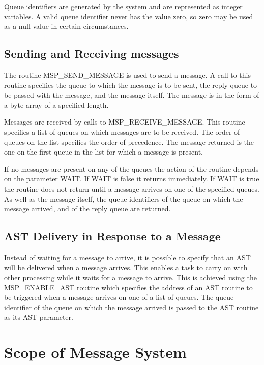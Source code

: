 Queue identifiers are generated by the system and are represented as
integer variables. A valid queue identifier never has the value zero,
so zero may be used as a null value in certain circumstances.

\subsection{Sending and Receiving messages}

The routine MSP\_SEND\_MESSAGE is used to send a message. A call to
this routine specifies the queue to which the message is to be sent, the
reply queue to be passed with the message, and the message itself. The
message is in the form of a byte array of a specified length.

Messages are received by calls to MSP\_RECEIVE\_MESSAGE. This routine
specifies a list of queues on which messages are to be received. The order of
queues on the list specifies the order of precedence. The message returned is
the one on the first queue in the list for which a message is present.

If no messages are present on any of the queues the action of the routine
depends on the parameter WAIT. If WAIT is false it returns immediately. If
WAIT is true the routine does not return until a message arrives on
one of the specified queues. As well as the message itself, the queue identifiers
of the queue on which the message arrived, and of the reply queue are returned.

\subsection{AST Delivery in Response to a Message}

Instead of waiting for a message to arrive, it is possible to specify that
an AST will be delivered when a message arrives. This enables a task to carry
on with other processing while it waits for a message to arrive. This is
achieved using the MSP\_ENABLE\_AST routine which specifies the address of an
AST routine to be triggered when a message arrives on one of a list of queues.
The queue identifier of the queue on which the message arrived is passed to
the AST routine as its AST parameter.
                                                    
\section{Scope of Message System}

